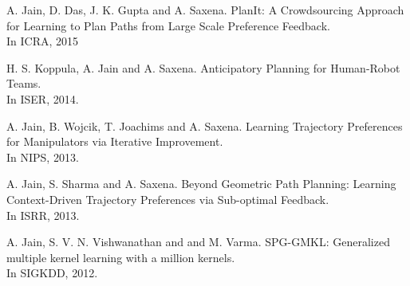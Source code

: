 \documentclass[line,margin]{res}
\begin{document}
\begin{resume}
 		A. Jain, D. Das, J. K. Gupta and  A. Saxena. PlanIt: A Crowdsourcing
Approach for Learning to Plan Paths from Large Scale Preference Feedback.\\In ICRA, 2015
 
 		H. S. Koppula, A. Jain and A. Saxena. Anticipatory Planning for
Human-Robot Teams.\\In ISER, 2014.
 
		 A. Jain, B. Wojcik, T. Joachims and A. Saxena. Learning Trajectory Preferences for Manipulators via Iterative Improvement.\\In NIPS, 2013.

 		A. Jain, S. Sharma  and A. Saxena. Beyond Geometric Path Planning:
Learning Context-Driven Trajectory Preferences via Sub-optimal Feedback.\\In ISRR, 2013.

  		A. Jain, S. V. N. Vishwanathan and and M. Varma. SPG-GMKL:
Generalized multiple kernel learning with a million kernels.\\In  SIGKDD, 2012.


\end{resume}
\end{document}
